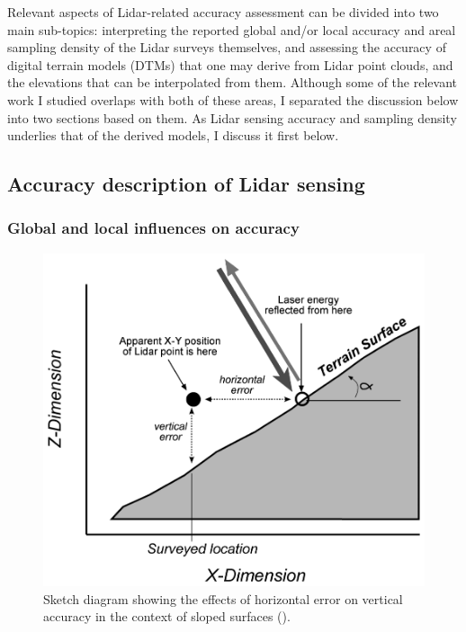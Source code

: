 Relevant aspects of Lidar-related accuracy assessment can be divided into two main sub-topics: interpreting the reported global and/or local accuracy and areal sampling density of the Lidar surveys themselves, and assessing the accuracy of digital terrain models (DTMs) that one may derive from Lidar point clouds, and the elevations that can be interpolated from them. Although some of the relevant work I studied overlaps with both of these areas, I separated the discussion below into two sections based on them. As Lidar sensing accuracy and sampling density underlies that of the derived models, I discuss it first below.

\subsection{Accuracy description of Lidar sensing}
\label{sub:lidaraccuracy_sensing}

\subsubsection{Global and local influences on accuracy}

\begin{figure}
    \includegraphics[width=0.95\linewidth]{final_report/figs/hodgson_breshanan_2004_01.png} 
    \caption{Sketch diagram showing the effects of horizontal error on vertical accuracy in the context of sloped surfaces (\cite{hodgson_breshanan_2004}).}
    \label{fig:elevationaccuracy}
\end{figure}

